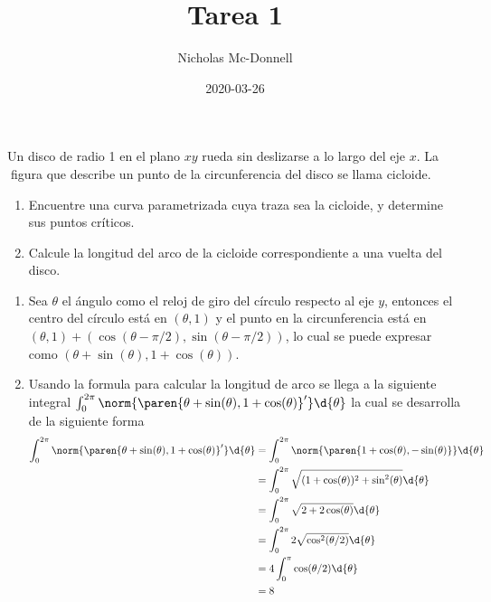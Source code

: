 \documentclass{homework}
\title{Tarea 1}
\date{2020-03-26}
\author{Nicholas Mc-Donnell}
\begin{document}
\maketitle
\newpage
{}


\begin{prob}
    Un disco de radio 1 en el plano \(xy\) rueda sin deslizarse a lo largo del eje \(x\). La figura que describe un punto de la circunferencia del disco se llama cicloide.
    \begin{enumerate}
        \item Encuentre una curva parametrizada cuya traza sea la cicloide, y determine sus puntos críticos.
        \item Calcule la longitud del arco de la cicloide correspondiente a una vuelta del disco.
    \end{enumerate}
\end{prob}

\begin{sol}
    \begin{enumerate}
        \item Sea \(\theta\) el ángulo como el reloj de giro del círculo respecto al eje \(y\), entonces el centro del círculo está en \((\theta,1)\) y el punto en la circunferencia está en \((\theta,1)+(\cos(\theta-\pi/2),\sin(\theta-\pi/2))\), lo cual se puede expresar como \((\theta+\sin(\theta),1+\cos(\theta))\).
        \item Usando la formula para calcular la longitud de arco se llega a la siguiente integral \(\int_0^{2\pi}\norm{\paren{\theta+\sin(\theta),1+\cos(\theta)}'}\d{\theta}\) la cual se desarrolla de la siguiente forma
              \begin{align*}
                  \int_0^{2\pi}\norm{\paren{\theta+\sin(\theta),1+\cos(\theta)}'}\d{\theta} & =\int_0^{2\pi}\norm{\paren{1+\cos(\theta),-\sin(\theta)}}\d{\theta} \\
                                                                                            & =\int_0^{2\pi}\sqrt{(1+\cos(\theta))^2+\sin^2(\theta)}\d{\theta}    \\
                                                                                            & =\int_0^{2\pi}\sqrt{2+2\cos(\theta)}\d{\theta}                      \\
                                                                                            & =\int_0^{2\pi}2\sqrt{\cos^2(\theta/2)}\d{\theta}                    \\
                                                                                            & =4\int_0^\pi\cos(\theta/2)\d{\theta}                                \\
                                                                                            & =8
              \end{align*}
    \end{enumerate}
\end{sol}
\end{document}
